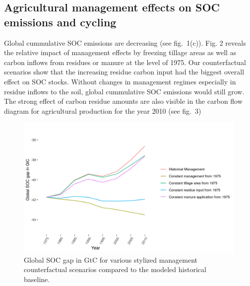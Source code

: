 \documentclass[gc, manuscript]{copernicus}
\begin{document}
\subsection{Agricultural management effects on SOC emissions and
cycling}

Global cummulative SOC emissions are decreasing (see fig.~1(c)). Fig. 2
reveals the relative impact of management effects by freezing tillage
areas as well as carbon inflows from residues or manure at the level of
1975. Our counterfactual scenarios show that the increasing residue
carbon input had the biggest overall effect on SOC stocks. Without
changes in management regimes especially in residue inflows to the soil,
global cummulative SOC emissions would still grow. The strong effect of
carbon residue amounts are also visible in the carbon flow diagram for
agricultural production for the year 2010 (see fig.~3)

\begin{figure}[H]
\includegraphics[width=18cm]{../ResultNotebooks/Output/Images/scenario} \caption{Global SOC gap in GtC for various stylized management counterfactual scenarios compared to the modeled historical baseline.}\label{fig:SOCscen}
\end{figure}
\end{document}
